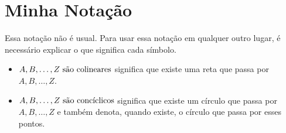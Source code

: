 \section{Minha Notação}
		Essa notação não é usual. Para usar essa notação em qualquer outro lugar, é necessário explicar o que significa cada símbolo.
		\begin{itemize}
			\item $\col{A}{B}{\dots}{Z}$ significa que existe uma reta que passa por $A, B, \dots, Z$.
			\item $\conc{A}{B}{\dots}{Z}$ significa que existe um círculo que passa por $A, B, \dots, Z$ e também denota, quando existe, o círculo que passa por esses pontos.
		\end{itemize}
